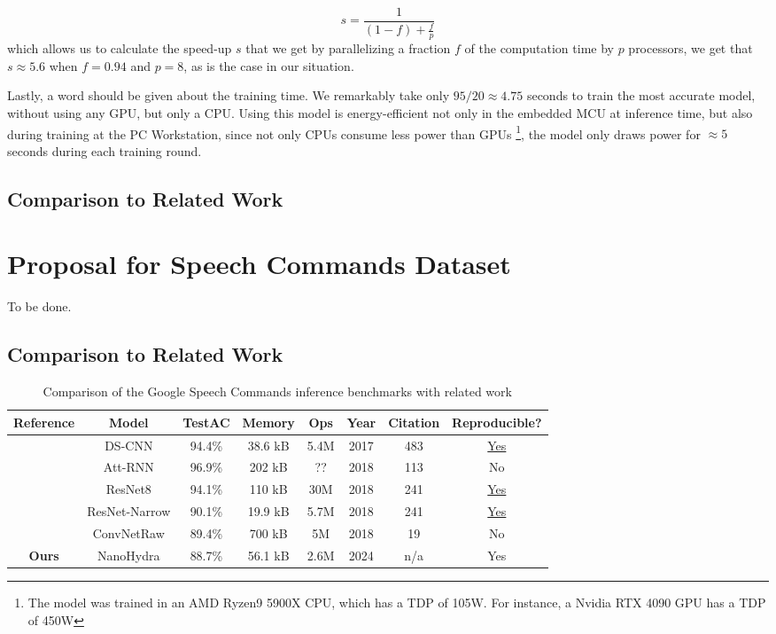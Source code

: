 \begin{equation}
s = \frac{1}{(1-f) + \frac{f}{p}}
\end{equation}
which allows us to calculate the speed-up $s$ that we get by parallelizing a fraction $f$ of the computation time by $p$ processors,
we get that $s \approx 5.6$ when $f=0.94$ and $p=8$, as is the case in our situation.

Lastly, a word should be given about the training time. We remarkably take only $95 / 20 \approx 4.75$ seconds to train the most accurate model, without using any GPU, but only a CPU.
Using this model is energy-efficient not only in the embedded MCU at inference time, but also during training at the PC Workstation, since not only CPUs consume less power than GPUs
\footnote{The model was trained in an AMD Ryzen9 5900X CPU, which has a TDP of 105W. For instance, a Nvidia RTX 4090 GPU has a TDP of 450W}, the model only draws power for $\approx5$ seconds during each training round. 

\subsection{Comparison to Related Work}

\section{Proposal for Speech Commands Dataset}\label{sec:rs_speechcomms}
To be done.

\subsection{Comparison to Related Work}
\begin{table}
\centerfloat
{}
    \begin{tabular}{ c c c c c c c c}
    \toprule
    Reference & Model & TestAC & Memory & Ops & Year & Citation & Reproducible? \\

    \midrule
    \cite{Zhang2017}   &        DS-CNN & 94.4\% & 38.6 kB & 5.4M & 2017 & 483 &  \href{https://github.com/ARM-software/ML-KWS-for-MCU}{Yes} \\
    \cite{Andrade2018} &       Att-RNN & 96.9\% &  202 kB &   ?? & 2018 & 113 &  No \\
    \cite{Tang2018}    &       ResNet8 & 94.1\% &  110 kB &  30M & 2018 & 241 &  \href{https://github.com/castorini/honk/}{Yes} \\
    \cite{Tang2018}    & ResNet-Narrow & 90.1\% & 19.9 kB & 5.7M & 2018 & 241 &  \href{https://github.com/castorini/honk/}{Yes} \\
    \cite{Jansson2018} &    ConvNetRaw & 89.4\% &  700 kB &   5M & 2018 &  19 &  No \\
    \textbf{Ours}      &     NanoHydra & 88.7\% & 56.1 kB & 2.6M & 2024 & n/a &  Yes \\
    \bottomrule
\end{tabular}
\caption{Comparison of the Google Speech Commands inference benchmarks with related work}
\end{table}

